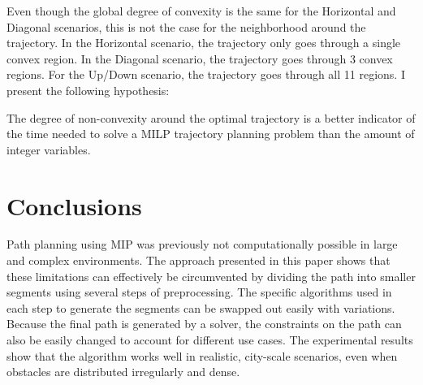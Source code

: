 Even though the global degree of convexity is the same for the Horizontal and Diagonal scenarios, this is not the case for the neighborhood around the trajectory. In the Horizontal scenario, the trajectory only goes through a single convex region. In the Diagonal scenario, the trajectory goes through 3 convex regions. For the Up/Down scenario, the trajectory goes through all 11 regions. I present the following hypothesis:
\begin{hyp}
The degree of non-convexity around the optimal trajectory is a better indicator of the time needed to solve a MILP trajectory planning problem than the amount of integer variables.
\label{hyp:nonconvex}
\end{hyp}



\chapter{Conclusions}
\label{section:conclusions}
Path planning using MIP was previously not computationally possible in large and complex environments. The approach presented in this paper shows that these limitations can effectively be circumvented by dividing the path into smaller segments using several steps of preprocessing. The specific algorithms used in each step to generate the segments can be swapped out easily with variations. Because the final path is generated by a solver, the constraints on the path can also be easily changed to account for different use cases. The experimental results show that the algorithm works well in realistic, city-scale scenarios, even when obstacles are distributed irregularly and dense.

